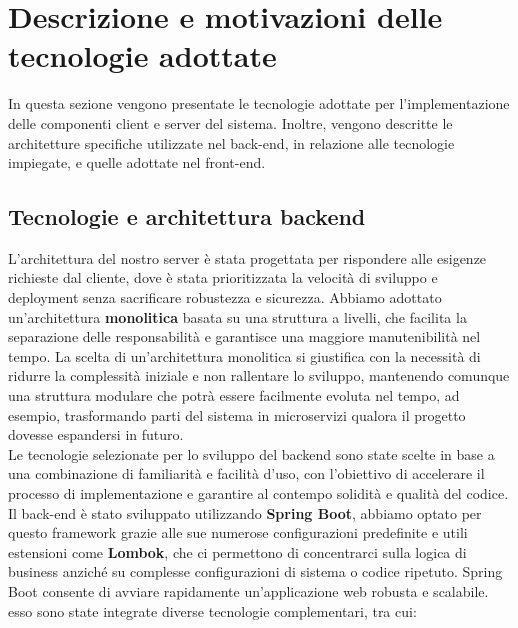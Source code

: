 \section{Descrizione e motivazioni delle tecnologie adottate }
In questa sezione vengono presentate le tecnologie adottate per l’implementazione delle componenti client e server del sistema.
Inoltre, vengono descritte le architetture specifiche utilizzate nel back-end, in relazione alle tecnologie impiegate, e quelle adottate nel front-end.

\subsection{Tecnologie e architettura backend}
L'architettura del nostro server è stata progettata per rispondere alle esigenze richieste dal cliente, dove è stata prioritizzata la velocità di sviluppo e deployment senza sacrificare robustezza e sicurezza. Abbiamo adottato un'architettura \textbf{monolitica} basata su una struttura a livelli, che facilita la separazione delle responsabilità e garantisce una maggiore manutenibilità nel tempo. La scelta di un'architettura monolitica si giustifica con la necessità di ridurre la complessità iniziale e non rallentare lo sviluppo, mantenendo comunque una struttura modulare che potrà essere facilmente evoluta nel tempo, ad esempio, trasformando parti del sistema in microservizi qualora il progetto dovesse espandersi in futuro.
\\
Le tecnologie selezionate per lo sviluppo del backend sono state scelte in base a una combinazione di familiarità e facilità d'uso, con l'obiettivo di accelerare il processo di implementazione e garantire al contempo solidità e qualità del codice.
\\
Il back-end è stato sviluppato utilizzando \textbf{Spring Boot}, abbiamo optato per questo framework grazie alle sue numerose configurazioni predefinite e utili estensioni come \textbf{Lombok}, che ci permettono di concentrarci sulla logica di business anziché su complesse configurazioni di sistema o codice ripetuto. Spring Boot consente di avviare rapidamente un'applicazione web robusta e scalabile.
esso sono state integrate diverse tecnologie complementari, tra cui:

